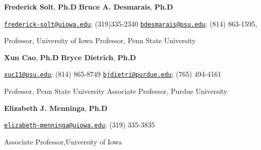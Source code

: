 \documentclass[10.5pt,]{article}
\providecommand{\tightlist}{%
	\setlength{\itemsep}{0pt}\setlength{\parskip}{0pt}}
\renewenvironment{itemize}{
	\begin{list}{}{
			\setlength{\leftmargin}{1.5em}
		}
	}{
	\end{list}
}
\begin{document}
\begin{itemize}
\tightlist
\item
  \textbf{Frederick Solt}, \textbf{Ph.D} \hfill \textbf{Bruce A.
  Desmarais}, \textbf{Ph.D}
\item
  \href{mailto:frederick-solt@uiowa.edu}{\nolinkurl{frederick-solt@uiowa.edu}};
  (319)335-2340
  \hfill  \href{mailto:bdesmarais@psu.edu}{\nolinkurl{bdesmarais@psu.edu}};
  (814) 863-1595,
\item
  Professor, University of Iowa \hfill  Professor, Penn State University
\item
  \textbf{Xun Cao}, \textbf{Ph.D} \hfill \textbf{Bryce Dietrich},
  \textbf{Ph.D}
\item
  \href{mailto:xuc11@psu.edu}{\nolinkurl{xuc11@psu.edu}}; (814) 865-8749
  \hfill  \href{mailto:bjdietri@purdue.edu}{\nolinkurl{bjdietri@purdue.edu}};
  (765) 494-4161
\item
  Professor, Penn State University \hfill Associate Professor, Purdue
  University
\item
  \textbf{Elizabeth J. Menninga}, \textbf{Ph.D}
\item
  \href{mailto:elizabeth-menninga@uiowa.edu}{\nolinkurl{elizabeth-menninga@uiowa.edu}};
  (319) 335-3835
\item
  Associate Professor,University of Iowa
\end{itemize}
	
			
\end{document}
